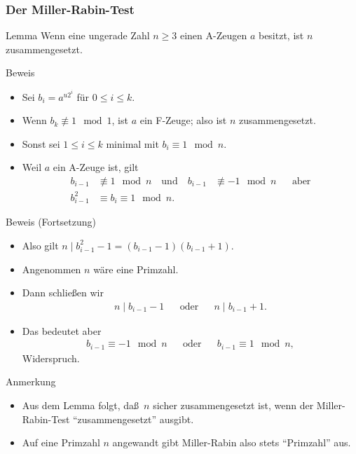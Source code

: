 \documentclass{beamer}
\renewcommand{\ae}{\"a}
\newcommand{\ue}{\"u}
\begin{document}
\begin{frame}\frametitle{Der Miller-Rabin-Test}
	\begin{block}{Lemma}
		Wenn eine ungerade Zahl $n\geq3$ einen A-Zeugen $a$ besitzt, ist $n$ zusammengesetzt.
	\end{block}
	\begin{overprint}
		\begin{block}{Beweis}
			\begin{itemize}
				\item Sei $b_i=a^{u2^i}$ f\ue r $0\leq i\leq k$.
				\item Wenn $b_k\not\equiv1\mod1$, ist $a$ ein F-Zeuge; also ist $n$ zusammengesetzt.
				\item Sonst sei $1\leq i\leq k$ minimal mit $b_i\equiv1\mod n$.
				\item Weil $a$ ein A-Zeuge ist, gilt 
					\begin{align*}
						b_{i-1}&\not\equiv1\mod n\quad\mbox{und}\quad b_{i-1}&\not\equiv-1\mod n&&\mbox{aber}\\
						b_{i-1}^2&\equiv b_i\equiv1\mod n.
					\end{align*}
			\end{itemize}	
		\end{block}
		\begin{block}{Beweis (Fortsetzung)}
			\begin{itemize}
				\item Also gilt $n\mid b_{i-1}^2-1=(b_{i-1}-1)(b_{i-1}+1)$.
				\item Angenommen $n$ w\ae re eine Primzahl.
				\item Dann schlie\ss en wir
					\begin{align*}
						n\mid b_{i-1}-1&&\mbox{oder}&&n\mid b_{i-1}+1.
					\end{align*}
				\item Das bedeutet aber
					\begin{align*}
						b_{i-1}\equiv-1\mod n&&\mbox{oder}&&b_{i-1}\equiv1\mod n,
					\end{align*}
					Widerspruch.
			\end{itemize}	
		\end{block}
		\begin{block}{Anmerkung}
			\begin{itemize}
				\item Aus dem Lemma folgt, da\ss\ $n$ sicher zusammengesetzt ist, wenn der Miller-Rabin-Test ``zusammengesetzt'' ausgibt.	
				\item Auf eine Primzahl $n$ angewandt gibt Miller-Rabin also stets ``Primzahl'' aus.
			\end{itemize}
		\end{block}
	\end{overprint}
\end{frame}
\end{document}
